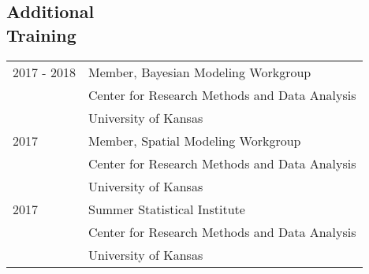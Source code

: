 \documentclass[margin,line,pifont,palatino,courier]{res}
\newenvironment{list1}{
  \begin{list}{\ding{113}}{%
      \setlength{\itemsep}{0in}
      \setlength{\parsep}{0in} \setlength{\parskip}{0in}
      \setlength{\topsep}{0in} \setlength{\partopsep}{0in}
      \setlength{\leftmargin}{0.17in}}}{\end{list}}
\begin{document}
\begin{resume}




\section{\sc Additional\\ Training}

\begin{tabular}{@{}p{0.8in}p{4in}}
  2017 - 2018   & Member, Bayesian Modeling Workgroup\\
            & Center for Research Methods and Data Analysis\\
            & University of Kansas\\
  2017      & Member, Spatial Modeling Workgroup\\
            & Center for Research Methods and Data Analysis\\
            & University of Kansas\\
  2017      & Summer Statistical Institute\\
            & Center for Research Methods and Data Analysis\\
            & University of Kansas\\
\end{tabular}



\end{resume}
\end{document}
